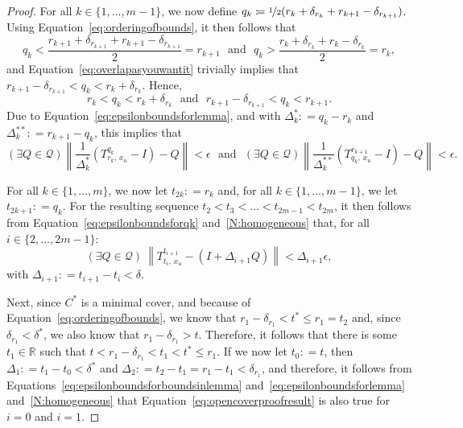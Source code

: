 \documentclass[10pt,a4paper]{paper}
\theoremstyle{definition}
\newcommand{\reals}{\mathbb{R}}
\newcommand{\rateset}{\mathcal{Q}}
\newcommand{\norm}[1]{\left\lVert #1 \right\rVert}
\newcommand{\coloneqq}{:\!=}
\begin{document}
\begin{proof}
For all $k\in\{1,\dots,m-1\}$, we now define $q_k\coloneqq\nicefrac{1}{2}(r_k+\delta_{r_k}+r_{k+1}-\delta_{r_{k+1}})$.
Using Equation~\eqref{eq:orderingofbounds}, it then follows that
\begin{equation*}
q_k<\frac{r_{k+1}+\delta_{r_{k+1}}+r_{k+1}-\delta_{r_{k+1}}}{2}=r_{k+1}
\text{~~and~~}
q_k>\frac{r_{k}+\delta_{r_{k}}+r_{k}-\delta_{r_{k}}}{2}=r_{k},
\end{equation*}
and Equation~\eqref{eq:overlapasyouwantit} trivially implies that $r_{k+1}-\delta_{r_{k+1}}<q_k<r_k+\delta_{r_k}$. Hence,
\begin{equation*}
r_k<q_k<r_k+\delta_{r_k}
\text{~~and~~}
r_{k+1}-\delta_{r_{k+1}}<q_k<r_{k+1}.
\end{equation*}
Due to Equation~\eqref{eq:epsilonboundsforlemma}, and with $\Delta^*_k\coloneqq q_k-r_k$ and $\Delta^{**}_k\coloneqq r_{k+1}-q_k$, this implies that
\begin{equation}\label{eq:epsilonboundsforqk}
(\exists Q\in\rateset)
\norm{\frac{1}{\Delta^*_k}
(T^{q_k}_{r_k,\,x_u}-I)-Q}<\epsilon
\text{~~and~~}
(\exists Q\in\rateset)
\norm{\frac{1}{\Delta^{**}_k}
(T^{r_{k+1}}_{q_k,\,x_u}-I)-Q}<\epsilon.
\end{equation}

For all $k\in\{1,\dots,m\}$, we now let $t_{2k}\coloneqq r_k$ and, for all $k\in\{1,\dots,m-1\}$, we let $t_{2k+1}\coloneqq q_k$. For the resulting sequence $t_2<t_3<\dots<t_{2m-1}<t_{2m}$, it then follows from Equation~\eqref{eq:epsilonboundsforqk} and~\ref{N:homogeneous} that, for all $i\in\{2,\dots,2m-1\}$:
\begin{equation}\label{eq:opencoverproofresult} 
(\exists Q\in\rateset)
~
\norm{
T^{t_{i+1}}_{t_i,\,x_u}-(I+\Delta_{i+1}Q)
}<\Delta_{i+1}\epsilon,
\end{equation}
with $\Delta_{i+1}\coloneqq t_{i+1}-t_i<\delta$.  

Next, since $C^*$ is a minimal cover, and because of Equation~\eqref{eq:orderingofbounds}, we know that $r_1-\delta_{r_1}<t^*\leq r_1=t_2$ and, since $\delta_{r_1}<\delta^*$, we also know that $r_1-\delta_{r_1}>t$. Therefore, it follows that there is some $t_1\in\reals$ such that $t<r_1-\delta_{r_1}<t_1<t^*\leq r_1$. If we now let $t_0\coloneqq t$, then $\Delta_1\coloneqq t_1-t_0<\delta^*$ and $\Delta_2\coloneqq t_2-t_1=r_1-t_1<\delta_{r_1}$, and therefore, it follows from Equations~\eqref{eq:epsilonboundsforboundsinlemma} and~\eqref{eq:epsilonboundsforlemma} and~\ref{N:homogeneous} that Equation~\eqref{eq:opencoverproofresult} is also true for $i=0$ and $i=1$.


\end{proof}
\end{document}
